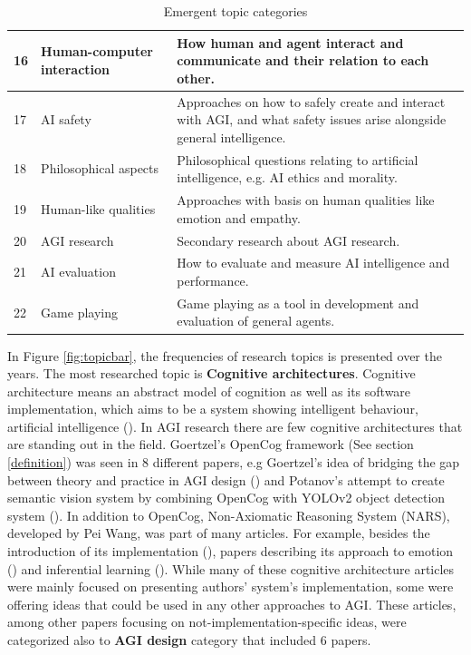 \documentclass[utf8,english]{gradu3}
\begin{document}
\begin{table}[H]
\begin{tabular}{p{0.05\linewidth} p{0.30\linewidth} p{0.65\linewidth}}
    16 & Human-computer interaction & How human and agent interact and communicate and their relation to each other.\\ \hline
    17 & AI safety & Approaches on how to safely create and interact with AGI, and what safety issues arise alongside general intelligence.\\ \hline
    18 & Philosophical aspects & Philosophical questions relating to artificial intelligence, e.g. AI ethics and morality.\\ \hline
    19 & Human-like qualities & Approaches with basis on human qualities like emotion and empathy.\\ \hline
    20 & AGI research & Secondary research about AGI research. \\ \hline
    21 & AI evaluation & How to evaluate and measure AI intelligence and performance.\\ \hline
    22 & Game playing  & Game playing as a tool in development and evaluation of general agents.\\ \hline

  \end{tabular}
  \caption{Emergent topic categories}
  \label{table:topicdescription}
\end{table}


In Figure \ref*{fig:topicbar}, the frequencies of research topics is presented
over the years. The most researched topic is \textbf{Cognitive architectures}.
Cognitive architecture means an abstract model of cognition as well as its
software implementation, which aims to be a system showing intelligent
behaviour, artificial intelligence (\cite{lieto2018}). In AGI research there are
few cognitive architectures that are standing out in the field. Goertzel's
OpenCog framework (See section \ref*{definition}) was seen in 8 different
papers, e.g Goertzel's idea of bridging the gap between theory and practice in
AGI design (\cite{goertzel2017agents}) and Potanov's attempt to create semantic
vision system by combining OpenCog with YOLOv2 object detection system
(\cite{potapov2018}). In addition to OpenCog, Non-Axiomatic Reasoning System
(NARS), developed by Pei Wang, was part of many articles. For example, besides
the introduction of its implementation (\cite{hammer2016opennars}), papers
describing its approach to emotion (\cite{wang2016emotional}) and inferential
learning (\cite{wang2016learning}). While many of these cognitive architecture
articles were mainly focused on presenting authors' system's implementation,
some were offering ideas that could be used in any other approaches to AGI.
These articles, among other papers focusing on not-implementation-specific
ideas, were categorized also to \textbf{AGI design} category that included 6
papers.
\end{document}
